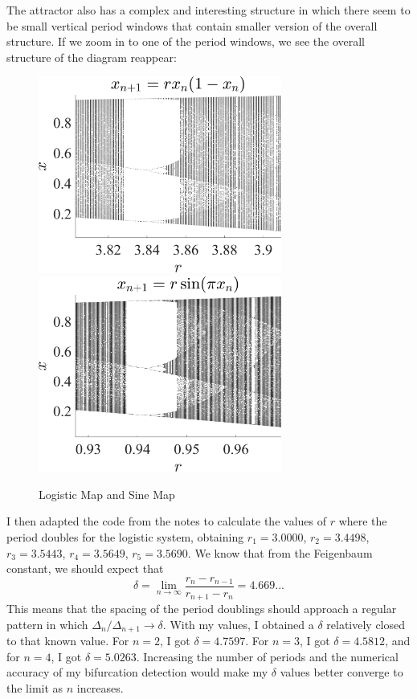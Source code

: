 \documentclass[11pt]{article}
\begin{document}
The attractor also has a complex and interesting structure in which there seem to be small vertical period windows that contain smaller version of the overall structure. If we zoom in to one of the period windows, we see the overall structure of the diagram reappear:
\begin{figure}[h]
\centering
\includegraphics[width=8cm]{Logistic_map_PW.png}
\includegraphics[width=8cm]{Sine_map_zoom_PW.png}
\caption{Logistic Map and Sine Map}
\end{figure}

I then adapted the code from the notes to calculate the values of $r$ where the period doubles for the logistic system, obtaining $r_1 = 3.0000$, $r_2=3.4498$,   $r_3 =  3.5443$, $r_4=    3.5649$, $r_5=    3.5690$. We know that from the Feigenbaum constant, we should expect that 
$$\delta = \lim_{n\rightarrow \infty} \frac{r_n - r_{n-1}}{r_{n+1} - r_n} = 4.669...$$
This means that the spacing of the period doublings should approach a regular pattern in which $\Delta_n / \Delta_{n+1} \rightarrow \delta$. With my values, I obtained a $\delta$ relatively closed to that known value. For $n = 2$, I got $\delta = 4.7597$. For $n = 3$, I got $\delta = 4.5812$, and for $n = 4$, I got  $\delta = 5.0263$. Increasing the number of periods and the numerical accuracy of my bifurcation detection would make my $\delta$ values better converge to the limit as $n$ increases.
\end{document}
